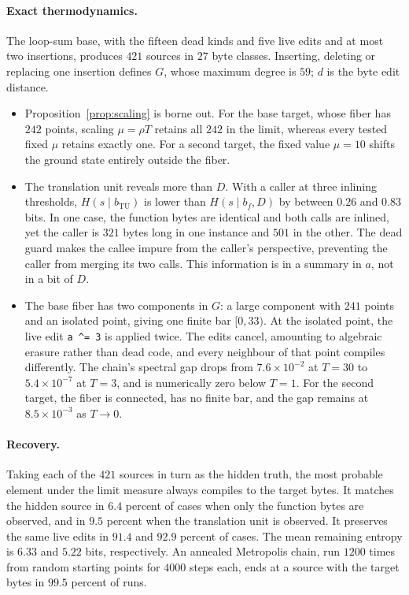 \documentclass[11pt]{article}
\theoremstyle{definition}
\theoremstyle{remark}
\begin{document}
\paragraph{Exact thermodynamics.} The loop-sum base, with the fifteen dead kinds and five live edits and at most two insertions, produces $421$ sources in $27$ byte classes. Inserting, deleting or replacing one insertion defines $G$, whose maximum degree is $59$; $d$ is the byte edit distance.
\begin{itemize}
  \item Proposition~\ref{prop:scaling} is borne out. For the base target, whose fiber has $242$ points, scaling $\mu = \rho T$ retains all $242$ in the limit, whereas every tested fixed $\mu$ retains exactly one. For a second target, the fixed value $\mu = 10$ shifts the ground state entirely outside the fiber.
  \item The translation unit reveals more than $D$. With a caller at three inlining thresholds, $H(s \mid b_{\mathrm{TU}})$ is lower than $H(s \mid b_f, D)$ by between $0.26$ and $0.83$ bits. In one case, the function bytes are identical and both calls are inlined, yet the caller is $321$ bytes long in one instance and $501$ in the other. The dead guard makes the callee impure from the caller's perspective, preventing the caller from merging its two calls. This information is in a summary in $a$, not in a bit of $D$.
  \item The base fiber has two components in $G$: a large component with $241$ points and an isolated point, giving one finite bar $[0, 33)$. At the isolated point, the live edit \texttt{a \^{}= 3} is applied twice. The edits cancel, amounting to algebraic erasure rather than dead code, and every neighbour of that point compiles differently. The chain's spectral gap drops from $7.6 \times 10^{-2}$ at $T = 30$ to $5.4 \times 10^{-7}$ at $T = 3$, and is numerically zero below $T = 1$. For the second target, the fiber is connected, has no finite bar, and the gap remains at $8.5 \times 10^{-3}$ as $T \to 0$.
\end{itemize}

\paragraph{Recovery.} Taking each of the $421$ sources in turn as the hidden truth, the most probable element under the limit measure always compiles to the target bytes. It matches the hidden source in $6.4$ percent of cases when only the function bytes are observed, and in $9.5$ percent when the translation unit is observed. It preserves the same live edits in $91.4$ and $92.9$ percent of cases. The mean remaining entropy is $6.33$ and $5.22$ bits, respectively. An annealed Metropolis chain, run $1200$ times from random starting points for $4000$ steps each, ends at a source with the target bytes in $99.5$ percent of runs.
\end{document}
